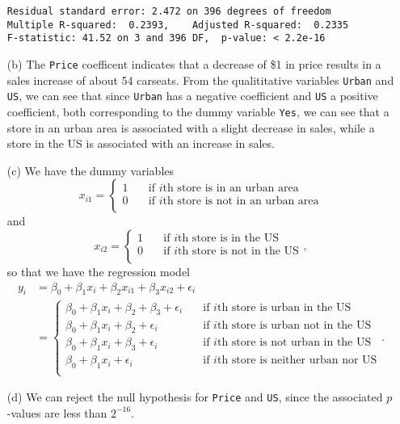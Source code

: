\begin{itemize}
\begin{verbatim}
Residual standard error: 2.472 on 396 degrees of freedom
Multiple R-squared:  0.2393,    Adjusted R-squared:  0.2335 
F-statistic: 41.52 on 3 and 396 DF,  p-value: < 2.2e-16
        \end{verbatim}\normalsize
    \item[(b)] The \verb|Price| coefficent indicates that a decrease of \$1 in price
        results in a sales increase of about 54 carseats. From the qualititative
        variables \verb|Urban| and \verb|US|, we can see that since \verb|Urban| 
        has a negative coefficient and \verb|US| a positive coefficient, both
        corresponding to the dummy variable \verb|Yes|, we can see that a store in
        an urban area is associated with a slight decrease in sales, while a store 
        in the US is associated with an increase in sales.
    \item[(c)] We have the dummy variables 
        \[
            x_{i1} = 
            \begin{cases}
                1 \quad &\text{if $i$th store is in an urban area} \\
                0 \quad &\text{if $i$th store is not in an urban area} \\
            \end{cases}
        \]
        and
        \[
            x_{i2} = 
            \begin{cases}
                1 \quad &\text{if $i$th store is in the US} \\
                0 \quad &\text{if $i$th store is not in the US} \\
            \end{cases},
        \]
        so that we have the regression model
        \begin{equation*}
            \begin{split}
                y_i &= \beta_0 + \beta_1 x_i + \beta_2 x_{i1} + \beta_3 x_{i2} + \epsilon_i \\
                &=
                \begin{cases}
                    \beta_0 + \beta_1x_i + \beta_2 + \beta_3 + \epsilon_i \quad 
                        &\text{if $i$th store is urban in the US} \\
                    \beta_0 + \beta_1x_i + \beta_2 + \epsilon_i \quad 
                        &\text{if $i$th store is urban not in the US} \\
                    \beta_0 + \beta_1x_i + \beta_3 + \epsilon_i \quad 
                        &\text{if $i$th store is not urban in the US} \\
                    \beta_0 + \beta_1x_i + \epsilon_i \quad 
                        &\text{if $i$th store is neither urban nor US} \\
                \end{cases}.
            \end{split}
        \end{equation*}
    \item[(d)] We can reject the null hypothesis for \verb|Price| and \verb|US|, since 
        the associated $p$-values are less than $2^{-16}$.
\end{itemize}

